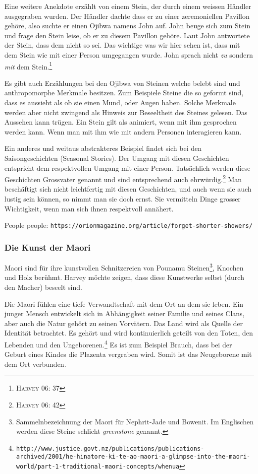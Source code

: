 Eine weitere Anekdote erzählt von einem Stein, der durch einem weissen Händler ausgegraben wurden. Der Händler dachte dass er zu einer zeremoniellen Pavillon gehöre, also suchte er einen Ojibwa namens John auf. John beuge sich zum Stein und frage den Stein leise, ob er zu diesem Pavillon gehöre. Laut John antwortete der Stein, dass dem nicht so sei. Das wichtige was wir hier sehen ist, dass mit dem Stein wie mit einer Person umgegangen wurde. John sprach nicht \emph{zu} sondern \emph{mit} dem Stein.\footnote{\textsc{Harvey 06: 37}} 

Es gibt auch Erzählungen bei den Ojibwa von Steinen welche belebt sind und anthropomorphe Merkmale besitzen. Zum Beispiele Steine die so geformt sind, dass es aussieht als ob sie einen Mund, oder Augen haben. Solche Merkmale werden aber nicht zwingend als Hinweis zur Beseeltheit des Steines gelesen. Das Aussehen kann trügen. Ein Stein gilt als animiert, wenn mit ihm gesprochen werden kann. Wenn man mit ihm wie mit andern Personen interagieren kann.

Ein anderes und weitaus abstrakteres Beispiel findet sich bei den Saisongeschichten (Seasonal Stories). Der Umgang mit diesen Geschichten entspricht dem respektvollen Umgang mit einer Person. Tatsächlich werden diese Geschichten Grossvater genannt und sind entsprechend auch ehrwürdig.\footnote{\textsc{Harvey 06: 42}} Man beschäftigt sich nicht leichtfertig mit diesen Geschichten, und auch wenn sie auch lustig sein können, so nimmt man sie doch ernst. Sie vermitteln Dinge grosser Wichtigkeit, wenn man sich ihnen respektvoll annähert.

People people: \texttt{https://orionmagazine.org/article/forget-shorter-showers/}

\subsubsection*{Die Kunst der Maori}
Maori sind für ihre kunstvollen Schnitzereien von Pounamu Steinen\footnote{Sammelnbezeichnung der Maori für Nephrit-Jade und Bowenit. Im Englischen werden diese Steine schlicht \emph{greenstone} genannt.}, Knochen und Holz berühmt. Harvey möchte zeigen, dass diese Kunstwerke selbst (durch den Macher) beseelt sind. 

Die Maori fühlen eine tiefe Verwandtschaft mit dem Ort an dem sie leben. Ein junger Mensch entwickelt sich in Abhängigkeit seiner Familie und seines Clans, aber auch die Natur gehört zu seinen Vorvätern. Das Land wird als Quelle der Identität betrachtet. Es gehört und wird kontinuierlich geteilt von den Toten, den Lebenden und den Ungeborenen.\footnote{\texttt{http://www.justice.govt.nz/publications/publications-archived/2001/he-hinatore-ki-te-ao-maori-a-glimpse-into-the-maori-world/part-1-traditional-maori-concepts/whenua}} Es ist zum Beispiel Brauch, dass bei der Geburt eines Kindes die Plazenta vergraben wird. Somit ist das Neugeborene mit dem Ort verbunden.

